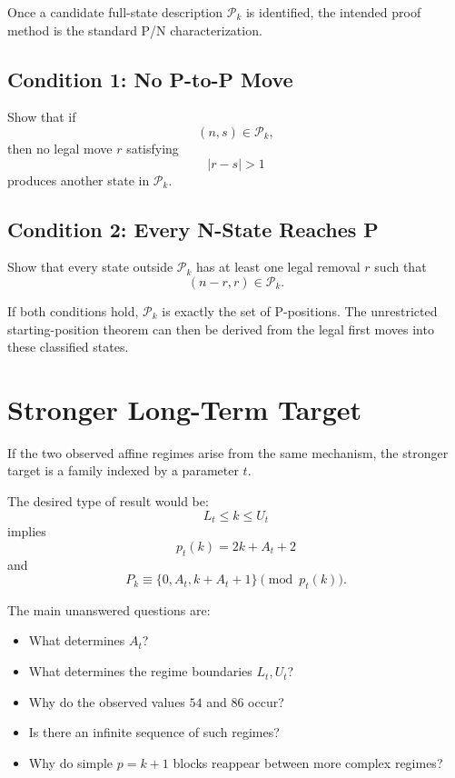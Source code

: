 \documentclass[11pt]{article}
\newcommand{\Ppos}{\mathcal{P}}
\begin{document}
Once a candidate full-state description $\Ppos_k$ is identified, the intended proof method is the standard P/N characterization.

\subsection{Condition 1: No P-to-P Move}
Show that if
\begin{equation}
    (n,s)\in\Ppos_k,
\end{equation}
then no legal move $r$ satisfying
\begin{equation}
    |r-s|>1
\end{equation}
produces another state in $\Ppos_k$.

\subsection{Condition 2: Every N-State Reaches P}
Show that every state outside $\Ppos_k$ has at least one legal removal $r$ such that
\begin{equation}
    (n-r,r)\in\Ppos_k.
\end{equation}

If both conditions hold, $\Ppos_k$ is exactly the set of P-positions. The unrestricted starting-position theorem can then be derived from the legal first moves into these classified states.

\section{Stronger Long-Term Target}

If the two observed affine regimes arise from the same mechanism, the stronger target is a family indexed by a parameter $t$.

The desired type of result would be:
\begin{equation}
    L_t\le k\le U_t
\end{equation}
implies
\begin{equation}
    p_t(k)=2k+A_t+2
\end{equation}
and
\begin{equation}
    P_k\equiv\{0,A_t,k+A_t+1\}\pmod{p_t(k)}.
\end{equation}

The main unanswered questions are:
\begin{itemize}
    \item What determines $A_t$?
    \item What determines the regime boundaries $L_t,U_t$?
    \item Why do the observed values $54$ and $86$ occur?
    \item Is there an infinite sequence of such regimes?
    \item Why do simple $p=k+1$ blocks reappear between more complex regimes?
\end{itemize}
\end{document}
